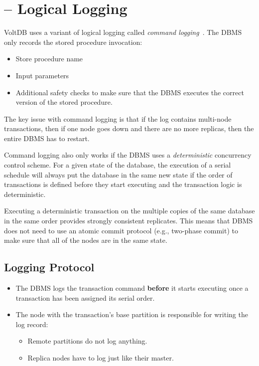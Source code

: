 \documentclass[11pt]{article}
\begin{document}
\section{ -- Logical Logging}
VoltDB uses a variant of logical logging called \textit{command logging}~\cite{malviya-icde14}.
The DBMS only records the stored procedure invocation:
\begin{itemize}
    \item
    Store procedure name
    
    \item
    Input parameters
    
    \item
    Additional safety checks to make sure that the DBMS executes the correct version of the stored 
    procedure.
\end{itemize}
        
The key issue with command logging is that if the log contains multi-node transactions, then if one 
node goes down and there are no more replicas, then the entire DBMS has to restart.

Command logging also only works if the DBMS uses a \textit{deterministic} concurrency control 
scheme. For a given state of the database, the execution of a serial schedule will always put 
the database in the same new state if the order of transactions is defined before they start 
executing and the transaction logic is deterministic.

Executing a deterministic transaction on the multiple copies of the same database in the same order 
provides strongly consistent replicates. This means that DBMS does not need to use an atomic commit 
protocol (e.g., two-phase commit) to make sure that all of the nodes are in the same state.

\subsection{Logging Protocol}
\begin{itemize}
    \item
    The DBMS logs the transaction command \textbf{before} it starts executing once a transaction has 
    been assigned its serial order.
    
    \item The node with the transaction's base partition is responsible for writing the log record:
    \begin{itemize}
        \item
        Remote partitions do not log anything.
        
        \item
        Replica nodes have to log just like their master.
    \end{itemize}
\end{itemize}
\end{document}
